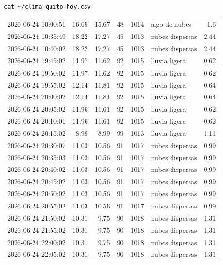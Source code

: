 \documentclass{article}
\begin{document}
\begin{enumerate}
\begin{enumerate}
\begin{verbatim}
cat ~/clima-quito-hoy.csv
\end{verbatim}

\begin{table}[htbp]
\label{tab:org2c42017}
\centering
\begin{tabular}{lrrrrlr}
2026-06-24 10:00:51 & 16.69 & 15.67 & 48 & 1014 & algo de nubes & 1.6\\
2026-06-24 10:35:49 & 18.22 & 17.27 & 45 & 1013 & nubes dispersas & 2.44\\
2026-06-24 10:40:02 & 18.22 & 17.27 & 45 & 1013 & nubes dispersas & 2.44\\
2026-06-24 19:45:02 & 11.97 & 11.62 & 92 & 1015 & lluvia ligera & 0.62\\
2026-06-24 19:50:02 & 11.97 & 11.62 & 92 & 1015 & lluvia ligera & 0.62\\
2026-06-24 19:55:02 & 12.14 & 11.81 & 92 & 1015 & lluvia ligera & 0.64\\
2026-06-24 20:00:02 & 12.14 & 11.81 & 92 & 1015 & lluvia ligera & 0.64\\
2026-06-24 20:05:02 & 11.96 & 11.61 & 92 & 1015 & lluvia ligera & 0.62\\
2026-06-24 20:10:01 & 11.96 & 11.61 & 92 & 1015 & lluvia ligera & 0.62\\
2026-06-24 20:15:02 & 8.99 & 8.99 & 99 & 1013 & lluvia ligera & 1.11\\
2026-06-24 20:30:07 & 11.03 & 10.56 & 91 & 1017 & nubes dispersas & 0.99\\
2026-06-24 20:35:03 & 11.03 & 10.56 & 91 & 1017 & nubes dispersas & 0.99\\
2026-06-24 20:40:02 & 11.03 & 10.56 & 91 & 1017 & nubes dispersas & 0.99\\
2026-06-24 20:45:02 & 11.03 & 10.56 & 91 & 1017 & nubes dispersas & 0.99\\
2026-06-24 20:50:02 & 11.03 & 10.56 & 91 & 1017 & nubes dispersas & 0.99\\
2026-06-24 20:55:02 & 11.03 & 10.56 & 91 & 1017 & nubes dispersas & 0.99\\
2026-06-24 21:50:02 & 10.31 & 9.75 & 90 & 1018 & nubes dispersas & 1.31\\
2026-06-24 21:55:02 & 10.31 & 9.75 & 90 & 1018 & nubes dispersas & 1.31\\
2026-06-24 22:00:02 & 10.31 & 9.75 & 90 & 1018 & nubes dispersas & 1.31\\
2026-06-24 22:05:02 & 10.31 & 9.75 & 90 & 1018 & nubes dispersas & 1.31\\

\end{tabular}
\end{table}
\end{enumerate}
\end{enumerate}
\end{document}
